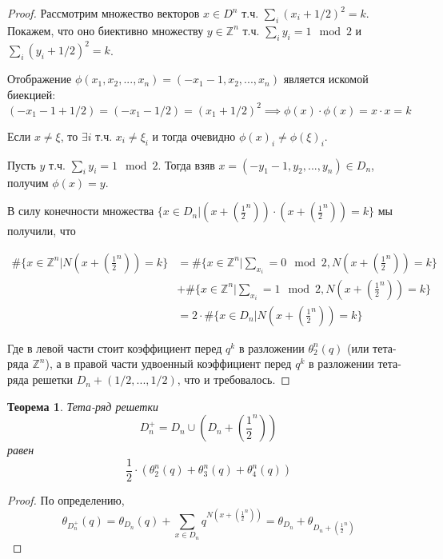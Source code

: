 \documentclass{article}
\newcommand{\ZZ}{\mathbb{Z}}
\theoremstyle{break}
\newtheorem{theorem}{Теорема}[section]
\begin{document}
\begin{proof}
	Рассмотрим множество векторов $x \in D^n$ т.ч. $\sum_i ({x_i} + 1/2)^2=k$.
	Покажем, что оно биективно множеству $y \in \ZZ^n$ т.ч. $\sum_i y_i = 1 \mod 2$ и $\sum_i ({y_i} + 1/2)^2=k$.
	
	Отображение $\phi(x_1, x_2, ..., x_n) = (-x_1 - 1, x_2, ..., x_n)$ является искомой биекцией:
		\begin{equation}(-x_1 - 1 + 1/2) = (-x_1 - 1/2) = (x_1 + 1/2)^2 \implies \phi(x) \cdot \phi(x) = x \cdot x = k\end{equation}
		
	Если $x \ne \xi$, то $\exists i$ т.ч. $x_i \ne \xi_i$ и тогда очевидно $\phi(x)_i \ne \phi(\xi)_i$.
	
	Пусть $y$ т.ч. $\sum_i y_i = 1 \mod 2$. Тогда взяв $x=(-y_1-1, y_2, ..., y_n) \in D_n$, получим $\phi(x)=y$.
	
	В силу конечности множества $\{x \in D_n | (x + (\frac{1}{2}^n)) \cdot (x + (\frac{1}{2}^n)) = k\}$
	мы получили, что
	
	\begin{align}
		\#\{x \in \ZZ^n | N(x  + (\frac{1}{2}^n)) = k\}
&= \#\{x \in \ZZ^n | \sum_{x_i} = 0 \mod 2,  N(x  + (\frac{1}{2}^n)) = k\} \\ \nonumber
&+  \#\{x \in \ZZ^n | \sum_{x_i} = 1 \mod 2,  N(x  + (\frac{1}{2}^n)) = k\} \\ \nonumber
&=	2 \cdot \#\{x \in D_n | N(x  + (\frac{1}{2}^n)) = k\} \nonumber
	\end{align}

	Где в левой части стоит коэффициент перед $q^k$ в разложении $\theta_2^n(q)$ 
	(или тета-ряда $\ZZ^n$), а в правой части удвоенный коэффициент перед $q^k$ в 
	разложении тета-ряда решетки $D_n + (1/2, ..., 1/2)$, что и требовалось.
\end{proof}

\begin{theorem}
	Тета-ряд решетки 
	\begin{equation}
		D_n^+ = D_n \cup (D_n + (\frac{1}{2}^n))
	\end{equation}
	равен 
	\begin{equation}
		\frac{1}{2} \cdot (\theta_{2}^n(q) + \theta_{3}^n(q) + \theta_4^n(q))
	\end{equation}
\end{theorem}
\begin{proof}
	По определению, 
	\begin{equation}
	\theta_{D_n^+}(q) 
	= \theta_{D_n}(q) + \sum_{x \in D_n} q^{N(x + (\frac{1}{2}^n))}
	= \theta_{D_n} + \theta_{D_n + (\frac{1}{2}^n)}
	\end{equation}
\end{proof}
\end{document}

